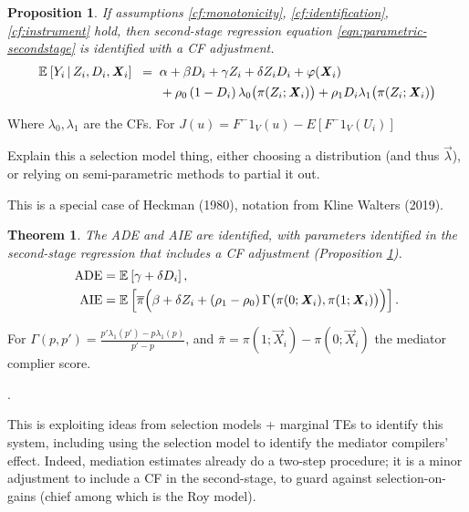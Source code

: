 \newtheorem{proposition}{Proposition}
\begin{proposition}
    \label{proposition:secondstage}
    If assumptions \ref{cf:monotonicity}, \ref{cf:identification}, \ref{cf:instrument} hold, then second-stage regression equation \eqref{eqn:parametric-secondstage} is identified with a CF adjustment.
    \begin{align*}
        \mathbb{E}_{} \left[ Y_i \, \middle\vert \, Z_i, D_i, \boldsymbol{\mathit{X}}_i \right] \;\; =& \;\;
            \alpha
            + \beta D_i
            + \gamma Z_i
            + \delta Z_i D_i
            + \varphi(\boldsymbol{\mathit{X}}_i) \\
            & \;\; +  \rho_0 \left( 1 - D_i \right) \lambda_0 \big( \pi(Z_i ; \boldsymbol{\mathit{X}}_i) \big)
                + \rho_1 D_i \lambda_1 \big( \pi(Z_i ; \boldsymbol{\mathit{X}}_i) \big)
    \end{align*}
\end{proposition}

Where $\lambda_0, \lambda_1$ are the CFs.
For $J(u) = F^-1_V(u) - E[ F^-1_V(U_i) ]$

Explain this a selection model thing, either choosing a distribution (and thus $\vec\lambda$), or relying on semi-parametric methods to partial it out.

This is a special case of Heckman (1980), notation from Kline Walters (2019).

\newtheorem{theoremCF}{Theorem}
\renewcommand\thetheoremCF{CF}
\begin{theoremCF}
    \label{thm:cf-identification}
    The ADE and AIE are identified, with parameters identified in the second-stage regression that includes a CF adjustment (Proposition \ref{proposition:secondstage}).
    \begin{align*}
    \text{ADE}
        &= \mathbb{E}_{} \left[ \gamma + \delta D_i \right], \\
    \text{AIE}
        &= \mathbb{E}_{} \left[  \overline{\pi}
            \Big( \beta +  \delta Z_i +
                (\rho_1 - \rho_0) \,
                \Gamma \big(\pi(0; \boldsymbol{\mathit{X}}_i), \pi(1; \boldsymbol{\mathit{X}}_i) \big)\Big) \right].
    \end{align*}
\end{theoremCF}
For $\Gamma\left(p,p'\right) = \frac{p'\lambda_1\left(p'\right) - p\lambda_1\left(p\right)}{p' - p}$, and $\bar\pi = \pi(1; \vec X_i) - \pi(0; \vec X_i)$ the mediator complier score.

\citep{kline2019heckits}.

This is exploiting ideas from selection models + marginal TEs to identify this system, including using the selection model to identify the mediator compilers’ effect.
Indeed, mediation estimates already do a two-step procedure; it is a minor adjustment to include a CF  in the second-stage, to guard against selection-on-gains (chief among which is the Roy model).

